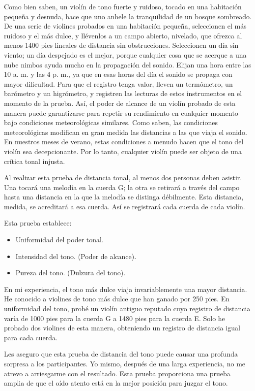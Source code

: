 Como bien saben, un violín de tono fuerte y ruidoso, tocado en una habitación pequeña y desnuda, hace que uno anhele la tranquilidad de un bosque sombreado. De una serie de violines probados en una habitación pequeña, seleccionen el más ruidoso y el más dulce, y llévenlos a un campo abierto, nivelado, que ofrezca al menos 1400 pies lineales de distancia sin obstrucciones. Seleccionen un día sin viento; un día despejado es el mejor, porque cualquier cosa que se acerque a una nube nimbos ayuda mucho en la propagación del sonido. Elijan una hora entre las 10 a. m. y las 4 p. m., ya que en esas horas del día el sonido se propaga con mayor dificultad. Para que el registro tenga valor, lleven un termómetro, un barómetro y un higrómetro, y registren las lecturas de estos instrumentos en el momento de la prueba. Así, el poder de alcance de un violín probado de esta manera puede garantizarse para repetir su rendimiento en cualquier momento bajo condiciones meteorológicas similares. Como saben, las condiciones meteorológicas modifican en gran medida las distancias a las que viaja el sonido. En nuestros meses de verano, estas condiciones a menudo hacen que el tono del violín sea decepcionante. Por lo tanto, cualquier violín puede ser objeto de una crítica tonal injusta.

Al realizar esta prueba de distancia tonal, al menos dos personas deben asistir.
Una tocará una melodía en la cuerda G; la otra se retirará a través del campo hasta una distancia en la que la melodía se distinga débilmente. Esta distancia, medida, se acreditará a esa cuerda. Así se registrará cada cuerda de cada violín.

Esta prueba establece:
\begin{itemize}
 \item Uniformidad del poder tonal.
 \item Intensidad del tono. (Poder de alcance).
 \item Pureza del tono. (Dulzura del tono).
\end{itemize}

En mi experiencia, el tono más dulce viaja invariablemente una mayor distancia. He conocido a violines de tono más dulce que han ganado por 250 pies. En uniformidad del tono, probé un violín antiguo reputado cuyo registro de distancia varía de 1000 pies para la cuerda G a 1480 pies para la cuerda E. Solo he probado dos violines de esta manera, obteniendo un registro de distancia igual para cada cuerda.

Les aseguro que esta prueba de distancia del tono puede causar una profunda sorpresa a los participantes. Yo mismo, después de una larga experiencia, no me atrevo a arriesgarme con el resultado. Esta prueba proporciona una prueba amplia de que el oído atento está en la mejor posición para juzgar el tono.

